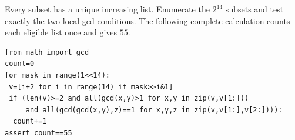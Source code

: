 Every subset has a unique increasing list. Enumerate the $2^{14}$ subsets and test exactly the two local gcd conditions. The following complete calculation counts each eligible list once and gives $\boxed{55}$.\begin{verbatim}
from math import gcd
count=0
for mask in range(1<<14):
 v=[i+2 for i in range(14) if mask>>i&1]
 if (len(v)>=2 and all(gcd(x,y)>1 for x,y in zip(v,v[1:]))
     and all(gcd(gcd(x,y),z)==1 for x,y,z in zip(v,v[1:],v[2:]))):
  count+=1
assert count==55
\end{verbatim}
